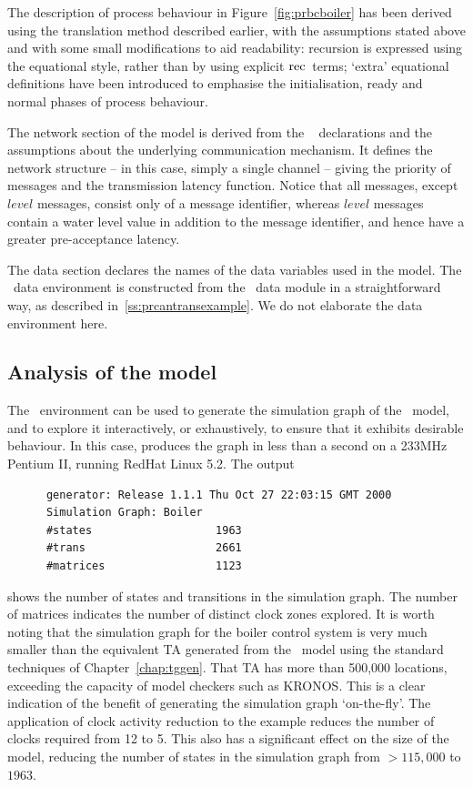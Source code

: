 The description of process behaviour in Figure~\ref{fig:prbcboiler} has been 
derived using the translation method described earlier, with the assumptions
stated above and with some small modifications to aid readability: recursion
is expressed using the equational style, rather than by using explicit
$\mathrm{rec\,}$ terms; `extra' equational definitions have been introduced to 
emphasise the initialisation, ready and normal phases of process behaviour.

The network section of the model is derived from the \candle\
 declarations and the assumptions about the underlying
communication mechanism. It defines the network structure -- in this
case, simply a single channel -- giving the priority of messages and
the transmission latency function. Notice that all messages, except
$level$ messages, consist only of a message identifier, whereas
$level$ messages contain a water level value in addition to the
message identifier, and hence have a greater pre-acceptance latency.

The data section declares the names of the data variables used in the model. 
The \bcandle\ data environment is constructed from the \sdml\ data module
in a straightforward way, as described in~\Sec\ref{ss:prcantransexample}.
We do not elaborate the data environment here.

\subsection{Analysis of the model}\label{ss:prexampleanal}
The \candleopen\ environment can be used to generate the simulation graph
of the \bcandle\ model, and to explore it interactively, or exhaustively, to
ensure that it exhibits desirable behaviour. In this case, \trm{generator}
produces the graph in less than a second on a 233MHz Pentium II, running 
RedHat Linux 5.2. The output
\begin{flushleft}
\begin{minipage}{\textwidth} 
\begin{verbatim}
      generator: Release 1.1.1 Thu Oct 27 22:03:15 GMT 2000
      Simulation Graph: Boiler
      #states                   1963
      #trans                    2661
      #matrices                 1123
\end{verbatim} 
\end{minipage}
\end{flushleft}
shows the number of states and transitions in the simulation graph. The
number of matrices indicates the number of distinct clock zones explored.
It is worth noting that the simulation graph for the boiler control
system is very much smaller than the equivalent TA generated from the
\bcandle\ model using the standard techniques of Chapter~\ref{chap:tggen}.
That TA has more than 500,000 locations, exceeding the capacity of 
model checkers such as KRONOS. This is a clear indication of the benefit
of generating the simulation graph `on-the-fly'. The application
of clock activity reduction to the example reduces the number of clocks
required from 12 to 5. This also has a significant effect on the size of
the model, reducing the number of states in the simulation graph from
$>115,000$ to $1963$.
 

